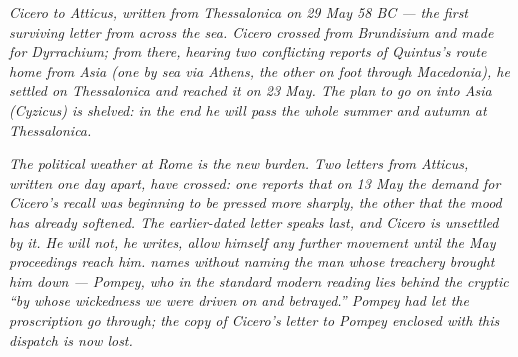 
\textit{Cicero to Atticus, written from Thessalonica on 29 May
58 BC --- the first surviving letter from across the sea.
Cicero crossed from Brundisium and made for Dyrrachium; from
there, hearing two conflicting reports of Quintus's route home
from Asia (one by sea via Athens, the other on foot through
Macedonia), he settled on Thessalonica and reached it on 23
May. The plan to go on into Asia (Cyzicus) is shelved: in the
end he will pass the whole summer and autumn at Thessalonica.}

\textit{The political weather at Rome is the new burden. Two
letters from Atticus, written one day apart, have crossed: one
reports that on 13 May the demand for Cicero's recall was
beginning to be pressed more sharply, the other that the mood
has already softened. The earlier-dated letter speaks last,
and Cicero is unsettled by it. He will not, he writes, allow
himself any further movement until the May proceedings reach
him.  names without naming the man whose
treachery brought him down --- Pompey, who in the standard
modern reading lies behind the cryptic ``by whose wickedness
we were driven on and betrayed.'' Pompey had let the proscription
go through; the copy of Cicero's letter to Pompey enclosed
with this dispatch is now lost.}
